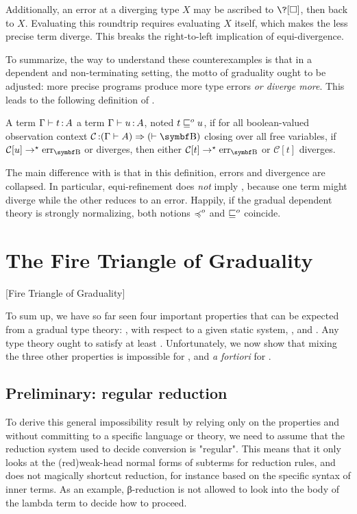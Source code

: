 Additionally, an error at a diverging type $X$ may be ascribed to $\?[\uni]$,
then back to $X$. Evaluating this
roundtrip requires evaluating $X$ itself, which makes the less
precise term diverge. This breaks the right-to-left implication of
equi-divergence.

To summarize,
the way to understand these counterexamples is that 
in a dependent and non-terminating setting, 
the motto of graduality ought to be adjusted: more precise programs produce
more type errors \emph{or diverge more}. This leads to the following definition
of .

\begin{definition}
  A term $\Gamma \vdash t \operatorname{:} A$  a term
  $\Gamma \vdash u \operatorname{:} A$, noted $t \sqsubseteq^{o} u$, if for all boolean-valued observation context
  $\mathcal{C} \ty (\Gamma \vdash A) \Rightarrow (\vdash \Bool)$ closing over all
  free variables, if $\mathcal{C}[u] \red \err[\Bool]$ or diverges,
  then either $\mathcal{C}[t] \red \err[\Bool]$ or $\mathcal{C}[t]$ diverges.
\end{definition}

The main difference with  is that
in this definition, errors and divergence are collapsed.
In particular, equi-refinement does \emph{not} imply ,
because one term might diverge while the other reduces to an error.
Happily, if the gradual dependent theory is strongly normalizing, both notions
 $\preccurlyeq^{o}$ and  $\sqsubseteq^{o}$
coincide.

\section{The Fire Triangle of Graduality}[Fire Triangle of Graduality]
\label{sec:fire-triangle}

To sum up, we have so far seen four important properties that can be expected from a
gradual type theory:
,  with respect to a given static system, ,
and . Any type theory ought to satisfy at least .
Unfortunately, we now show that mixing the three other properties is impossible for ,
and \textit{a fortiori} for .

\subsection{Preliminary: regular reduction}
To derive this general impossibility result by relying only on the properties
and without committing to a specific language or theory,
we need to assume that the reduction system used to decide conversion is "regular".
This means that it only looks at the \kl(red){weak-head} normal forms of
subterms for reduction rules,
and does not magically shortcut reduction,
for instance based on the specific syntax of inner terms.
As an example, β-reduction is not allowed to look into the body of
the lambda term to decide how to proceed.

